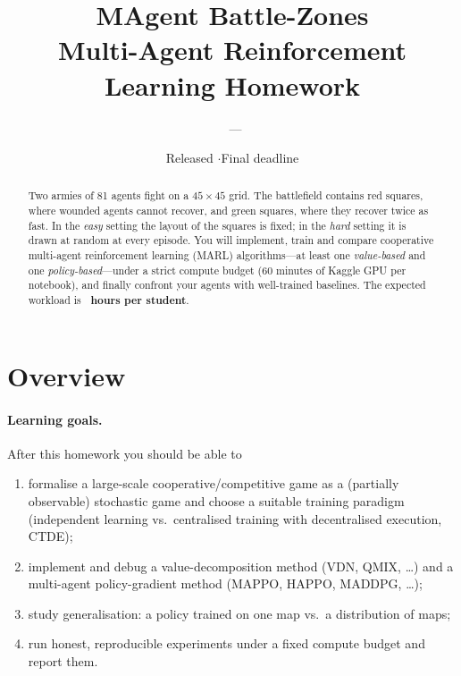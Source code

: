 \documentclass[11pt,a4paper]{article}
\title{\textbf{MAgent Battle-Zones}\\[2pt]
       \large Multi-Agent Reinforcement Learning Homework}
\author{\CourseName\ --- \Semester}
\date{Released \DateStart\quad$\cdot$\quad Final deadline \DateEnd}
\newcommand{\red}[1]{\textcolor{red!70!black}{#1}}
\newcommand{\green}[1]{\textcolor{green!45!black}{#1}}
\begin{document}
\maketitle
\thispagestyle{fancy}

\begin{abstract}
\noindent Two armies of 81 agents fight on a $45\times45$ grid.  The battlefield
contains \red{red squares}, where wounded agents cannot recover, and
\green{green squares}, where they recover twice as fast.  In the \emph{easy} setting the
layout of the squares is fixed; in the \emph{hard} setting it is drawn at random at every
episode.  You will implement, train and compare cooperative multi-agent reinforcement
learning (MARL) algorithms---at least one \emph{value-based} and one
\emph{policy-based}---under a strict compute budget (60 minutes of Kaggle GPU per
notebook), and finally confront your agents with well-trained baselines.  The expected
workload is \textbf{\Workload\ hours per student}.
\end{abstract}

\tableofcontents

\section{Overview}

\paragraph{Learning goals.}
After this homework you should be able to
\begin{enumerate}
  \item formalise a large-scale cooperative/competitive game as a (partially observable)
        stochastic game and choose a suitable training paradigm (independent learning vs.\
        centralised training with decentralised execution, CTDE);
  \item implement and debug a value-decomposition method (VDN, QMIX, \dots) and a
        multi-agent policy-gradient method (MAPPO, HAPPO, MADDPG, \dots);
  \item study generalisation: a policy trained on one map vs.\ a distribution of maps;
  \item run honest, reproducible experiments under a fixed compute budget and report them.
\end{enumerate}
\end{document}
